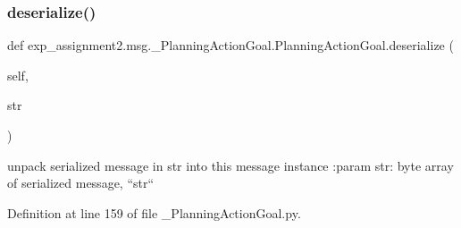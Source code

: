 \subsubsection{\texorpdfstring{deserialize()}{deserialize()}}
{\footnotesize\ttfamily def exp\+\_\+assignment2.\+msg.\+\_\+\+Planning\+Action\+Goal.\+Planning\+Action\+Goal.\+deserialize (\begin{DoxyParamCaption}\item[{}]{self,  }\item[{}]{str }\end{DoxyParamCaption})}

\begin{DoxyVerb}unpack serialized message in str into this message instance
:param str: byte array of serialized message, ``str``
\end{DoxyVerb}
 

Definition at line 159 of file \+\_\+\+Planning\+Action\+Goal.\+py.


